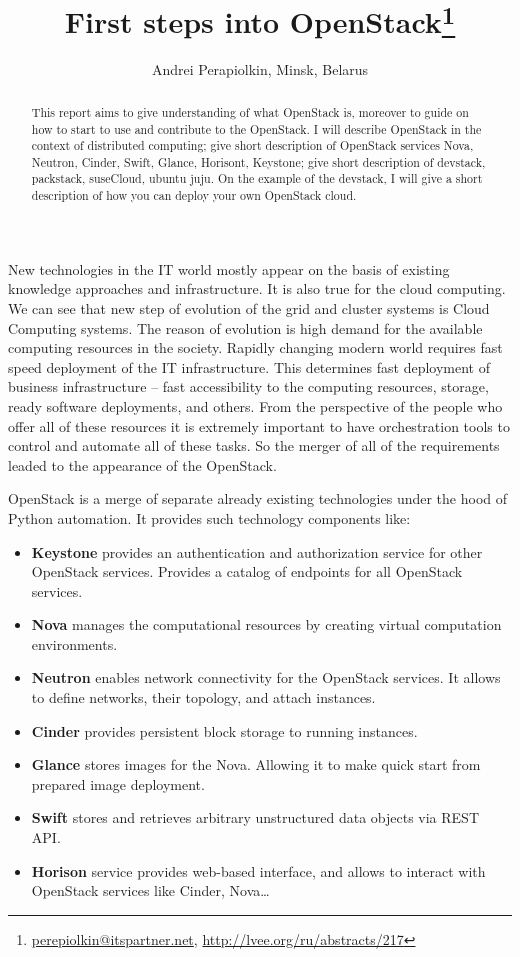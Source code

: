 \documentclass[10pt, a5paper]{article}
\begin{document}
\title{First steps into OpenStack\footnote{\url{perepiolkin@itspartner.net}, \url{http://lvee.org/ru/abstracts/217}}}
\author{Andrei Perapiolkin, Minsk, Belarus}
\maketitle
\begin{abstract}
This report aims to give understanding of what OpenStack is, moreover to guide on how to start to use and contribute to the OpenStack. I will describe OpenStack in the context of distributed computing; give short description of OpenStack services Nova, Neutron, Cinder, Swift, Glance, Horisont, Keystone; give short description of devstack, packstack, suseCloud, ubuntu juju. On the example of the devstack, I will give a short description of how you can deploy your own OpenStack cloud.
\end{abstract}


New technologies in the IT world mostly appear on the basis of existing knowledge approaches and infrastructure. It is also true for the cloud computing. We can see that new step of evolution of the grid and cluster systems is Cloud Computing systems. The reason of evolution is high demand for the available computing resources in the society. Rapidly changing modern world requires fast speed deployment of the IT infrastructure. This determines fast deployment of business infrastructure -- fast accessibility to the computing resources, storage, ready software deployments, and others. From the perspective of the people who offer all of these resources it is extremely important to have orchestration tools to control and automate all of these tasks. So the merger of all of the requirements leaded to the appearance of the OpenStack.

OpenStack is a merge of separate already existing technologies under the hood of Python automation. It provides such technology components like:

\begin{itemize}
  \item \textbf{Keystone} provides an authentication and authorization service for other OpenStack services. Provides a catalog of endpoints for all OpenStack services.
  \item \textbf{Nova} manages the computational resources by creating virtual computation environments.
  \item \textbf{Neutron} enables network connectivity for the OpenStack services. It allows to define networks, their topology, and attach instances.
  \item \textbf{Cinder} provides persistent block storage to running instances.
  \item \textbf{Glance} stores images for the Nova. Allowing it to make quick start from prepared image deployment.
  \item \textbf{Swift} stores and retrieves arbitrary unstructured data objects via REST API.
  \item \textbf{Horison} service provides web-based interface, and allows to \linebreak interact with OpenStack services like Cinder, Nova…
\end{itemize}
\end{document}
